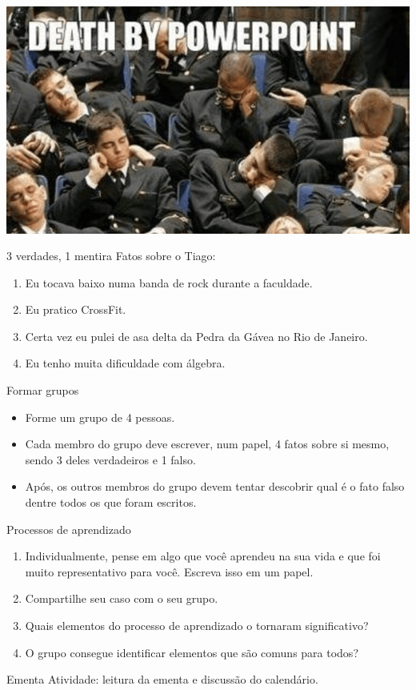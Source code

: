 \documentclass{beamer}
\begin{document}
\begin{frame}{}
\includegraphics[width=\textwidth]{deathbypowerpoint.png}
\end{frame}

\begin{frame}{3 verdades, 1 mentira}
\Large
  Fatos sobre o Tiago:
  \begin{enumerate}
    \item Eu tocava baixo numa banda de rock durante a faculdade.
    \item Eu pratico CrossFit.
    \item Certa vez eu pulei de asa delta da Pedra da Gávea no Rio de Janeiro.
    \item Eu tenho muita dificuldade com álgebra.
  \end{enumerate}
\end{frame}

\begin{frame}{Formar grupos}
\Large
  \begin{itemize}
    \item Forme um grupo de 4 pessoas.
    \item Cada membro do grupo deve escrever, num papel, 4 fatos sobre si mesmo,
      sendo 3 deles verdadeiros e 1 falso.
    \item Após, os outros membros do grupo devem tentar descobrir qual é o fato
      falso dentre todos os que foram escritos.
  \end{itemize}
\end{frame}

\begin{frame}{Processos de aprendizado}
\Large
\begin{enumerate}
\item Individualmente, pense em algo que você aprendeu na sua vida e que foi
  muito representativo para você. Escreva isso em um papel.
\item <2-> Compartilhe seu caso com o seu grupo.
\item <3-> Quais elementos do processo de aprendizado o tornaram significativo?
\item <4-> O grupo consegue identificar elementos que são comuns para todos?
\end{enumerate}
\end{frame}

  \begin{frame}{Ementa}
    \Large
    Atividade: leitura da ementa e discussão do calendário.

  \end{frame}
\end{document}
